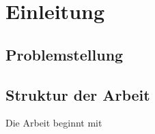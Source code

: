 \chapter{Einleitung}

\section{Problemstellung}

\section{Struktur der Arbeit}
Die Arbeit beginnt mit 